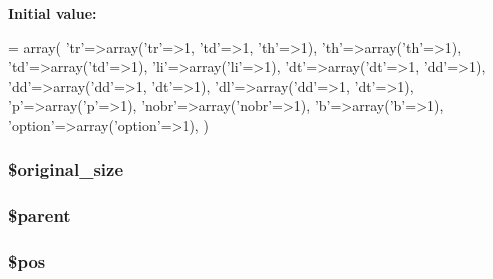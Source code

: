 {\bfseries Initial value\+:}
\begin{DoxyCode}
= array(
        \textcolor{stringliteral}{'tr'}=>array(\textcolor{stringliteral}{'tr'}=>1, \textcolor{stringliteral}{'td'}=>1, \textcolor{stringliteral}{'th'}=>1),
        \textcolor{stringliteral}{'th'}=>array(\textcolor{stringliteral}{'th'}=>1),
        \textcolor{stringliteral}{'td'}=>array(\textcolor{stringliteral}{'td'}=>1),
        \textcolor{stringliteral}{'li'}=>array(\textcolor{stringliteral}{'li'}=>1),
        \textcolor{stringliteral}{'dt'}=>array(\textcolor{stringliteral}{'dt'}=>1, \textcolor{stringliteral}{'dd'}=>1),
        \textcolor{stringliteral}{'dd'}=>array(\textcolor{stringliteral}{'dd'}=>1, \textcolor{stringliteral}{'dt'}=>1),
        \textcolor{stringliteral}{'dl'}=>array(\textcolor{stringliteral}{'dd'}=>1, \textcolor{stringliteral}{'dt'}=>1),
        \textcolor{charliteral}{'p'}=>array(\textcolor{charliteral}{'p'}=>1),
        \textcolor{stringliteral}{'nobr'}=>array(\textcolor{stringliteral}{'nobr'}=>1),
        \textcolor{charliteral}{'b'}=>array(\textcolor{charliteral}{'b'}=>1),
        \textcolor{stringliteral}{'option'}=>array(\textcolor{stringliteral}{'option'}=>1),
    )
\end{DoxyCode}
\hypertarget{classsimple__html__dom_ac22338e9abaeaf63325d69086f9ac644}{
\subsubsection[{\$original\+\_\+size}]{\setlength{\rightskip}{0pt plus 5cm}\$original\+\_\+size}}\label{classsimple__html__dom_ac22338e9abaeaf63325d69086f9ac644}
\hypertarget{classsimple__html__dom_a4e2313a4b35b72a06ac45fd38960f677}{
\subsubsection[{\$parent}]{\setlength{\rightskip}{0pt plus 5cm}\$parent\hspace{0.3cm}{\ttfamily [protected]}}}\label{classsimple__html__dom_a4e2313a4b35b72a06ac45fd38960f677}
\hypertarget{classsimple__html__dom_a5de51f0c80b3bb3b39a57b23f6b9ea9f}{
\subsubsection[{\$pos}]{\setlength{\rightskip}{0pt plus 5cm}\$pos\hspace{0.3cm}{\ttfamily [protected]}}}\label{classsimple__html__dom_a5de51f0c80b3bb3b39a57b23f6b9ea9f}
